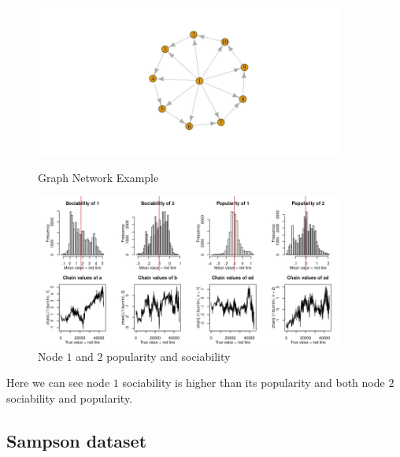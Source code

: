 \documentclass[12pt]{ociamthesis}  %
\begin{document}
	\begin{figure}[H]
		\centering
		\begin{minipage}{\textwidth}
			\centering
			\includegraphics[width=0.9\textwidth]{GraphCovariates2} %
			\caption{Graph Network Example}
			\label{label-image23}
		\end{minipage}\hfill
		\begin{minipage}{\textwidth}
			\centering
			\includegraphics[width=0.9\textwidth]{PlotCovariates3} %
			\caption{Node $1$ and $2$ popularity and sociability}
			\label{label-image24}
		\end{minipage}
	\end{figure} Here we can see node $1$ sociability is higher than its popularity and both node $2$ sociability and popularity.
	
	\subsection{Sampson dataset}
	
\end{document}
